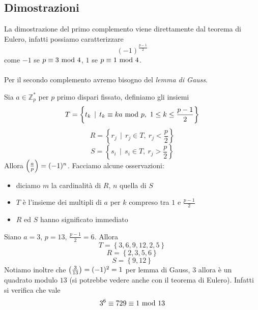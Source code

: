 \subsection{Dimostrazioni}
\begin{osservazione}
	La dimostrazione del primo complemento viene direttamente dal teorema di Eulero, infatti possiamo caratterizzare 
	\begin{equation*}
	(-1)^{\frac{p-1}{2}}
	\end{equation*}
	come $-1$ se $p\equiv3\ \mathrm{mod}\ 4$, $1$ se $p\equiv1\ \mathrm{mod}\ 4$. \\ \\ Per il secondo complemento avremo bisogno del \textit{lemma di Gauss}.
\end{osservazione}
\begin{teorema}
	Sia $a\in\mathbb{Z}_p^*$ per $p$ primo dispari fissato, definiamo gli insiemi
	\begin{equation*}
	T=\left\{t_k\,\mid\,t_k\equiv ka\ \mathrm{mod}\ p, \ 1\leq k\leq \frac{p-1}{2}\right\}
	\end{equation*}
	\begin{equation*}
	R=\left\{r_j\,\mid\,r_j\in T, \ r_j< \frac{p}{2}\right\}
	\end{equation*}
	\begin{equation*}
	S=\left\{s_i\,\mid\,s_i\in T, \ r_j> \frac{p}{2}\right\}
	\end{equation*}
	Allora $\left(\frac{a}{p}\right)=(-1)^n$. Facciamo alcune osservazioni:
	\begin{itemize}
		\item diciamo $m$ la cardinalità di $R$, $n$ quella di $S$ 
		\item $T$ è l'insieme dei multipli di $a$ per $k$ compreso tra $1$ e $\frac{p-1}{2}$
		\item $R$ ed $S$ hanno significato immediato
	\end{itemize}
	
	
\end{teorema}
\begin{esempio}
	Siano $a=3$, $p=13$, $\frac{p-1}{2}=6$. Allora
	\begin{equation*}
	T=\left\{3,6,9,12,2,5\right\}
	\end{equation*}
	\begin{equation*}
	R=\left\{2,3,5,6\right\}
	\end{equation*}
	\begin{equation*}
	S=\left\{9,12\right\}
	\end{equation*}
	Notiamo inoltre che $\left(\frac{3}{13}\right)=(-1)^2=1$ per lemma di Gauss, $3$ allora è un quadrato modulo $13$ (si potrebbe vedere anche con il teorema di Eulero). Infatti si verifica che vale
	\begin{equation*}
	3^6\equiv729\equiv1\ \mathrm{mod}\ 13
	\end{equation*}
\end{esempio}
